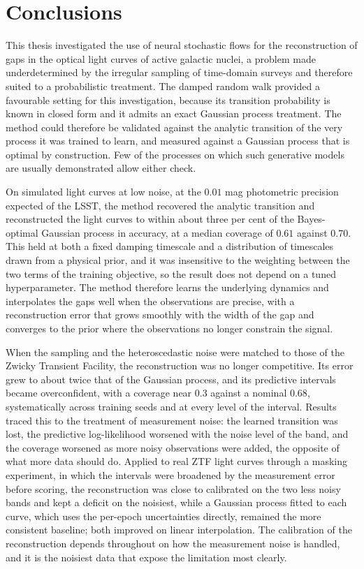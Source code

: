 \chapter{Conclusions}
\label{chap:conclusions}

This thesis investigated the use of neural stochastic flows for the reconstruction of gaps in the optical light curves of active galactic nuclei, a problem made underdetermined by the irregular sampling of time-domain surveys and therefore suited to a probabilistic treatment. The damped random walk provided a favourable setting for this investigation, because its transition probability is known in closed form and it admits an exact Gaussian process treatment. The method could therefore be validated against the analytic transition of the very process it was trained to learn, and measured against a Gaussian process that is optimal by construction. Few of the processes on which such generative models are usually demonstrated allow either check.

On simulated light curves at low noise, at the $0.01$ mag photometric precision expected of the LSST, the method recovered the analytic transition and reconstructed the light curves to within about three per cent of the Bayes-optimal Gaussian process in accuracy, at a median coverage of $0.61$ against $0.70$. This held at both a fixed damping timescale and a distribution of timescales drawn from a physical prior, and it was insensitive to the weighting between the two terms of the training objective, so the result does not depend on a tuned hyperparameter. The method therefore learns the underlying dynamics and interpolates the gaps well when the observations are precise, with a reconstruction error that grows smoothly with the width of the gap and converges to the prior where the observations no longer constrain the signal.

When the sampling and the heteroscedastic noise were matched to those of the Zwicky Transient Facility, the reconstruction was no longer competitive. Its error grew to about twice that of the Gaussian process, and its predictive intervals became overconfident, with a coverage near $0.3$ against a nominal $0.68$, systematically across training seeds and at every level of the interval. Results traced this to the treatment of measurement noise: the learned transition was lost, the predictive log-likelihood worsened with the noise level of the band, and the coverage worsened as more noisy observations were added, the opposite of what more data should do. Applied to real ZTF light curves through a masking experiment, in which the intervals were broadened by the measurement error before scoring, the reconstruction was close to calibrated on the two less noisy bands and kept a deficit on the noisiest, while a Gaussian process fitted to each curve, which uses the per-epoch uncertainties directly, remained the more consistent baseline; both improved on linear interpolation. The calibration of the reconstruction depends throughout on how the measurement noise is handled, and it is the noisiest data that expose the limitation most clearly.

